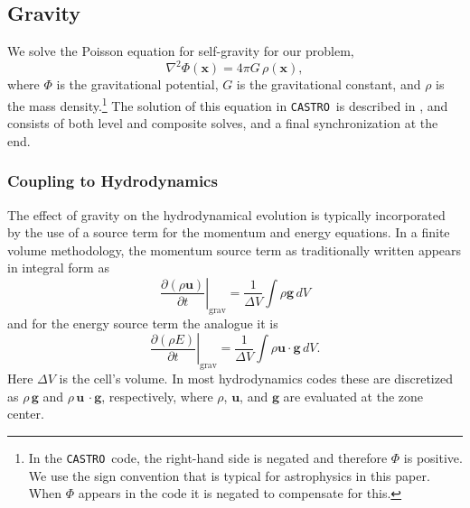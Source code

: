 \documentclass[iop]{../emulateapj}
\newcommand{\castro}{\texttt{CASTRO}}
\begin{document}
\subsection{Gravity}
\label{sec:gravity}

We solve the Poisson equation for self-gravity for our problem,
\begin{equation}
  \nabla^2 \Phi(\mathbf{x}) = 4\pi G\, \rho(\mathbf{x}),
\end{equation}
where $\Phi$ is the gravitational potential, $G$ is the gravitational
constant, and $\rho$ is the mass density.\footnote{In the \castro\ code, the 
right-hand side is negated and therefore $\Phi$ is positive. We use the 
sign convention that is typical for astrophysics in this paper. 
When $\Phi$ appears in the code it is negated to compensate for this.} 
The solution of this equation in \castro\ is described in \cite{castro}, and
consists of both level and composite solves, and a final
synchronization at the end.

\subsubsection{Coupling to Hydrodynamics}\label{sec:gravity_hydro_coupling}

The effect of gravity on the hydrodynamical evolution is typically
incorporated by the use of a source term for the momentum and energy
equations. In a finite volume methodology, the momentum source term 
as traditionally written appears in integral form as
\begin{equation}
  \left.\frac{\partial (\rho \mathbf{u})}{\partial t}\right|_{\text{grav}} = \frac{1}{\Delta V} \int \rho \mathbf{g}\, dV
\end{equation}
and for the energy source term the analogue it is
\begin{equation}
  \left.\frac{\partial (\rho E)}{\partial t}\right|_{\text{grav}} = \frac{1}{\Delta V} \int \rho \mathbf{u}\cdot\mathbf{g}\, dV \label{eq:cell_center_gravity_source}.
\end{equation}
Here $\Delta V$ is the cell's volume.
In most hydrodynamics codes these are discretized as $\rho\,
\mathbf{g}$ and $\rho\, \mathbf{u}\,\cdot\mathbf{g}$, respectively, 
where $\rho$, $\mathbf{u}$, and $\mathbf{g}$ 
are evaluated at the zone center. 
\end{document}
